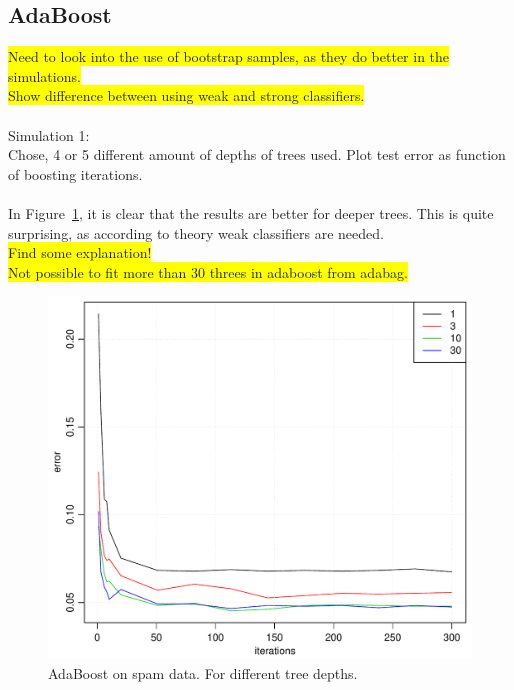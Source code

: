 \subsection{AdaBoost}
\label{sub:SimAdaBoost}
\colorbox{yellow}{Need to look into the use of bootstrap samples, as they do better in the simulations.} 
\\ \colorbox{yellow}{Show difference between using weak and strong classifiers.}\\
\\
Simulation 1: \\
Chose, 4 or 5 different amount of depths of trees used. Plot test error as function of boosting iterations.\\
\\
In Figure~\ref{fig:adaboostSpam}, it is clear that the results are better for deeper trees. This is quite surprising, as according to theory weak classifiers are needed. \\
\colorbox{yellow}{Find some explanation!}\\
\colorbox{yellow}{Not possible to fit more than 30 threes in adaboost from adabag.}
\\
\begin{figure}[h!]
\begin{center}
    \includegraphics[scale=0.5]{./figures/adaboostSpam.pdf}
\end{center}
\caption{AdaBoost on spam data. For different tree depths.}
\label{fig:adaboostSpam}
\end{figure}

